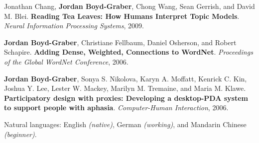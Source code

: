 \documentclass[10pt,a4paper]{article} %
\begin{document}
\begin{multicols}{2}
\begin{enumerate*}
\item Jonathan Chang, {\bf Jordan Boyd-Graber}, Chong Wang, Sean Gerrish,
and David M. Blei.  {\bf Reading Tea Leaves: How Humans Interpret
  Topic Models}.  \emph{Neural Information Processing Systems}, 2009.

\item {\bf Jordan Boyd-Graber}, Christiane Fellbaum, Daniel Osherson, and
Robert Schapire.  {\bf Adding Dense, Weighted, Connections to
  {WordNet}}.  \emph{Proceedings of the Global {WordNet} Conference},
2006.

\item {\bf Jordan Boyd-Graber}, Sonya S. Nikolova, Karyn A. Moffatt, Kenrick
C. Kin, Joshua Y. Lee, Lester W. Mackey, Marilyn M. Tremaine, and
Maria M. Klawe.  {\bf Participatory design with proxies: {D}eveloping
  a desktop-{PDA} system to support people with aphasia}.
\emph{Computer-Human Interaction}, 2006.


\end{enumerate*}

\end{multicols}

\spacedhrule{1.6em}{-0.4em} %


\inlineheadsection %
{Natural languages:}
{English \textit{(native)}, German \textit{(working)}, and Mandarin Chinese \textit{(beginner)}.}

\end{document}
